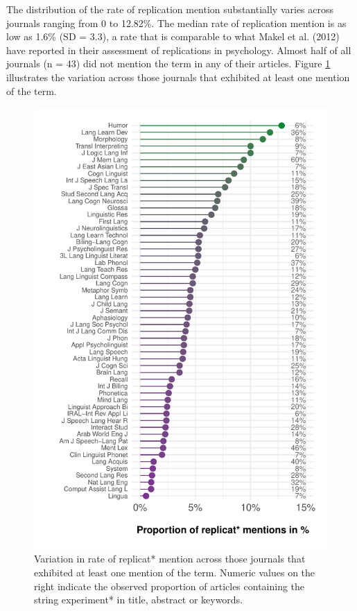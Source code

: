 \documentclass[]{elsarticle} %
\begin{document}
The distribution of the rate of replication mention substantially varies across journals ranging from 0 to 12.82\%. The median rate of replication mention is as low as 1.6\% (SD = 3.3), a rate that is comparable to what Makel et al. (2012) have reported in their assessment of replications in psychology.
Almost half of all journals (n = 43) did not mention the term in any of their articles.
Figure \ref{fig:topten-plot} illustrates the variation across those journals that exhibited at least one mention of the term.

\begin{figure}

{\centering \includegraphics{ReplicationLing_files/figure-latex/topten-plot-1} 

}

\caption{Variation in rate of replicat* mention across those journals that exhibited at least one mention of the term. Numeric values on the right indicate the observed proportion of articles containing the string experiment* in title, abstract or keywords.}\label{fig:topten-plot}
\end{figure}
\end{document}
